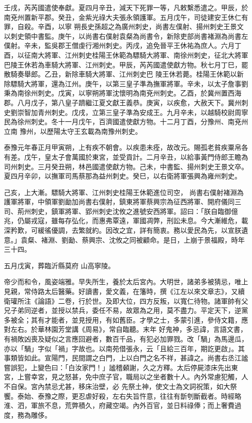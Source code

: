 \begin{pinyinscope}
 壬戌，芮芮國遣使奉獻。夏四月辛丑，減天下死罪一等，凡敕繫悉遣之。甲辰，於南兗州置新平郡。癸丑，金紫光祿大夫張永領護軍。五月戊午，司徒建安王休仁有罪，自殺。辛酉，以寧
 朔長史孫超之為廣州刺史，尚書左僕射、揚州刺史王景文以刺史領中書監。庚午，以尚書右僕射袁粲為尚書令，新除吏部尚書褚淵為尚書左僕射。辛未，監吳郡王僧虔行湘州刺史。丙戌，追免晉平王休祐為庶人。六月丁酉，以征南大將軍、江州刺史桂陽王休範為驃騎大將軍、南徐州刺史，征北大將軍巴陵王休若為車騎大將軍、江州刺史。甲辰，芮芮國遣使獻方物。秋七月丁巳，罷散騎奏舉郎。乙丑，新除車騎大將軍、江州刺史巴
 陵王休若薨。桂陽王休範以新除驃騎大將軍，還為江州。庚午，以第三皇子準為撫軍將軍。辛未，以太子詹事劉秉為南徐州刺史。戊寅，以寧朔將軍沈懷明為南兗州刺史。乙酉，於冀州置西海郡。八月戊子，第八皇子躋繼江夏文獻王義恭。庚寅，以疾愈，大赦天下。冀州刺史劉崇智加青州刺史。戊戌，立第三皇子準為安成王。九月辛未，以越騎校尉周寧民為徐州刺史。冬十一月戊午，百濟國遣使獻方物。十二月丁酉，分豫州、南兗州立南
 豫州，以歷陽太守王玄載為南豫州刺史。



 泰豫元年春正月甲寅朔，上有疾不朝會。以疾患未痊，故改元。賜孤老貧疾粟帛各有差。戊午，皇太子會萬國於東宮，並受貢計。二月辛丑，以給事黃門侍郎王瞻為司州刺史。三月癸丑朔，林邑國遣使獻方物。己未，中書監、揚州刺史王景文卒。夏四月辛卯，以撫軍司馬蔡那為益州刺史。癸巳，以右衛將軍張興為雍州刺史。



 己亥，上大漸。驃騎大將軍、江州刺史桂陽王休範進位司空，
 尚書右僕射褚淵為護軍將軍，中領軍劉勔加尚書右僕射，鎮東將軍蔡興宗為征西將軍、開府儀同三司、荊州刺史，鎮軍將軍、郢州刺史沈攸之進號安西將軍。詔曰：「朕自臨御億兆，仍屬戎寇，雖每存弘化，而惠弗覃遠，軍國凋弊，刑訟未息。今大漸維危，載深矜歎，可緩徭優調，去繁就約。因改之宜，詳有簡衷。務以愛民為先，以宣朕遺意。」袁粲、褚淵、劉勔、蔡興宗、沈攸之同被顧命。是日，上崩于景福殿，時年三十四。



 五月戊寅，葬臨沂縣莫府
 山高寧陵。



 帝少而和令，風姿端雅。早失所生，養於太后宮內。大明世，諸弟多被猜忌，唯上見親，常侍路太后醫藥。好讀書，愛文義，在籓時，撰《江左以來文章志》，又續衛瓘所注《論語》二卷，行於世。及即大位，四方反叛，以寬仁待物。諸軍帥有父兄子弟同逆者，並授以禁兵，委任不易，故眾為之用，莫不盡力。平定天下，逆黨多被全；其有才能者，並見授用，有如舊臣。才學之士，多蒙引進，參侍文籍，應對左右。於華林園芳堂講《周易》，常自臨聽。末年
 好鬼神，多忌諱，言語文書，有禍敗凶喪及疑似之言應回避者，數百千品，有犯必加罪戮。改「騧」為馬邊瓜，亦以「騧」字似「禍」字故也。以南苑借張永，云「且給三百年，期訖更啟」。其事類皆如此。宣陽門，民間謂之白門，上以白門之名不祥，甚諱之。尚書右丞江謐嘗誤犯，上變色曰：「白汝家門！」謐稽顙謝，久之方釋。太后停屍漆床先出東宮，上嘗幸宮，見之怒甚，免中庶子官，職局以之坐者數十人。內外常慮犯觸，人不自保。宮內禁忌尤甚，移床治壁，必
 先祭土神，使文士為文詞祝策，如大祭饗。泰始、泰豫之際，更忍虐好殺，左右失旨忤意，往往有斮刳斷截者。時經略淮、泗，軍旅不息，荒弊積久，府藏空竭。內外百官，並日料祿俸；而上奢費過度，務為雕侈。




\end{pinyinscope}
